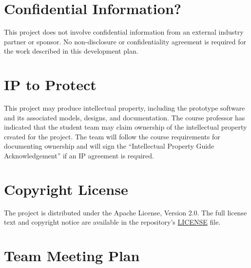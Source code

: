 \documentclass{article}
\begin{document}
\section{Confidential Information?}


This project does not involve confidential information from an external
industry partner or sponsor. No non-disclosure or confidentiality agreement is
required for the work described in this development plan.

\section{IP to Protect}



This project may produce intellectual property, including the prototype
software and its associated models, designs, and documentation. The course
professor has indicated that the student team may claim ownership of the
intellectual property created for the project. The team will follow the course
requirements for documenting ownership and will sign the ``Intellectual
Property Guide Acknowledgement'' if an IP agreement is required.

\section{Copyright License}


The project is distributed under the Apache License, Version 2.0. The full
license text and copyright notice are available in the repository's
\href{../../LICENSE}{LICENSE} file.

\section{Team Meeting Plan}

\end{document}
